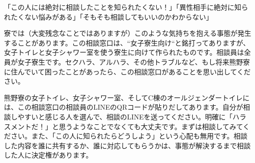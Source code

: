 「この人には絶対に相談したことを知られたくない！」「異性相手に絶対に知られたくない悩みがある」「そもそも相談してもいいのかわからない」

寮では（大変残念なことではありますが）このような気持ちを抱える事態が発生することがあります。この相談窓口は、“女子寮生向け“と銘打ってありますが、女子トイレと女子シャワー室を使う寮生に向けて作られたものです。相談員は全員が女子寮生です。セクハラ、アルハラ、その他トラブルなど、もし将来熊野寮に住んでいて困ったことがあったら、この相談窓口があることを思い出してください。


熊野寮の女子トイレ、女子シャワー室、そしてC棟のオールジェンダートイレには、この相談窓口の相談員のLINEのQRコードが貼りだしてあります。自分が相談しやすいと感じる人を選んで、相談のLINEを送ってください。明確に「ハラスメントだ！」と思うようなことでなくても大丈夫です。まずは相談してみてください。また、「この人に知られたらどうしよう」という心配も無用です。相談した内容を誰に共有するか、誰に対応してもらうかは、事態が解決するまで相談した人に決定権があります。
